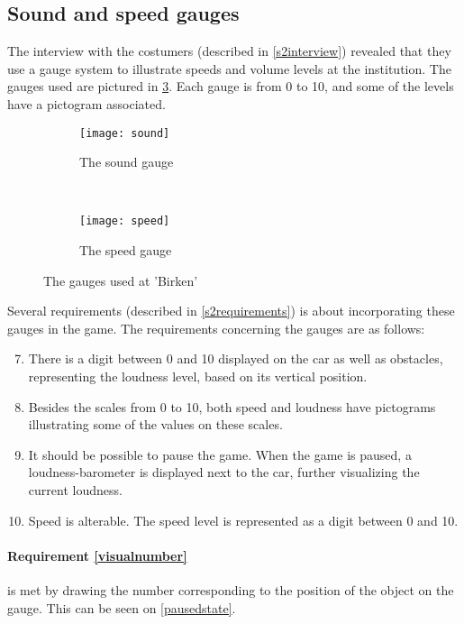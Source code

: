 \subsection{Sound and speed gauges}
The interview with the costumers (described in \cref{s2interview}) revealed that they use a gauge system to illustrate speeds and volume levels at the institution. 
The gauges used are pictured in \cref{gauges}.
Each gauge is from 0 to 10, and some of the levels have a pictogram associated.

\begin{figure}[h]
	\centering
        \begin{subfigure}[b]{0.5\textwidth}
                \texttt{[image: sound]}
                \caption{The sound gauge}
                \label{soundgauge}
        \end{subfigure}%
        ~
        \begin{subfigure}[b]{0.5\textwidth}
                \texttt{[image: speed]}
                \caption{The speed gauge}
                \label{speedgauge}
        \end{subfigure}
        \caption{The gauges used at 'Birken'}\label{fig:animals}
        \label{gauges}
\end{figure}

Several requirements (described in \cref{s2requirements}) is about incorporating these gauges in the game.
The requirements concerning the gauges are as follows:

\begin{enumerate}
\setcounter{enumi}{6}
\item \label{visualnumber} There is a digit between 0 and 10 displayed on the car as well as obstacles, representing the loudness level, based on its vertical position. 
\item \label{pictogram} Besides the scales from 0 to 10, both speed and loudness have pictograms illustrating some of the values on these scales.
\item \label{pause} It should be possible to pause the game. When the game is paused, a loudness-barometer is displayed next to the car, further visualizing the current loudness.
\item \label{speeditem} Speed is alterable. The speed level is represented as a digit between 0 and 10.
\end{enumerate}


\paragraph{Requirement \ref{visualnumber}} is met by drawing the number corresponding to the position of the object on the gauge. 
This can be seen on \cref{pausedstate}.

